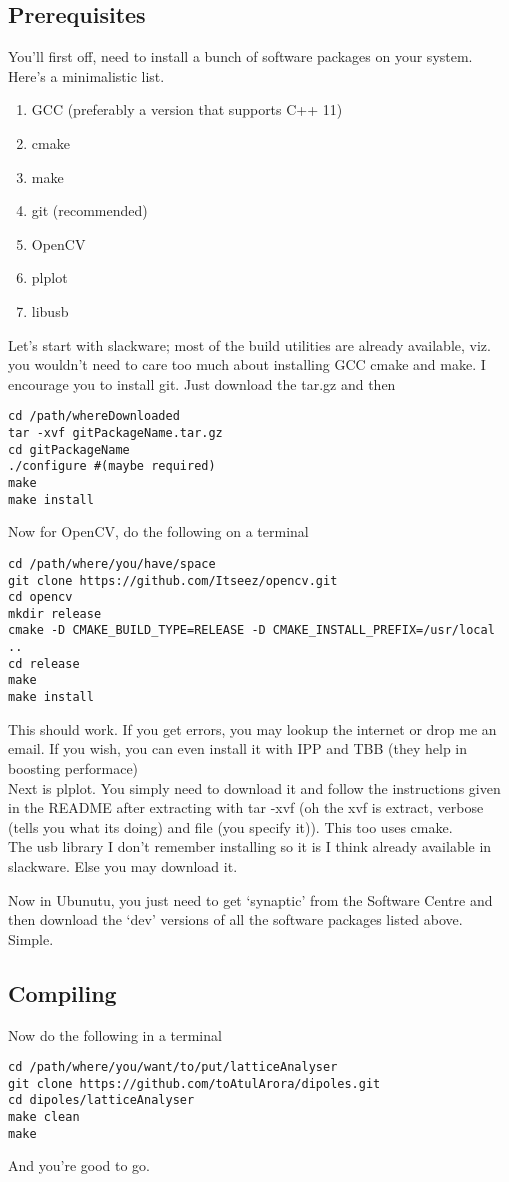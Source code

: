 	\subsection{Prerequisites}
		You'll first off, need to install a bunch of software packages on your system. Here's a minimalistic list.
		\begin{enumerate}
			\item GCC (preferably a version that supports C++ 11)
			\item cmake
			\item make
			\item git (recommended)
			\item OpenCV
			\item plplot
			\item libusb
		\end{enumerate}
		Let's start with slackware; most of the build utilities are already available, viz. you wouldn't need to care too much about installing GCC cmake and make. I encourage you to install git. Just download the tar.gz and then
		\begin{lstlisting}
cd /path/whereDownloaded
tar -xvf gitPackageName.tar.gz
cd gitPackageName
./configure #(maybe required)
make
make install
		\end{lstlisting}
		Now for OpenCV, do the following on a terminal
		\begin{lstlisting}
cd /path/where/you/have/space
git clone https://github.com/Itseez/opencv.git
cd opencv
mkdir release
cmake -D CMAKE_BUILD_TYPE=RELEASE -D CMAKE_INSTALL_PREFIX=/usr/local ..
cd release
make
make install
		\end{lstlisting}
		This should work. If you get errors, you may lookup the internet or drop me an email. If you wish, you can even install it with IPP and TBB (they help in boosting performace)\\
		Next is plplot. You simply need to download it and follow the instructions given in the README after extracting with tar -xvf (oh the xvf is extract, verbose (tells you what its doing) and file (you specify it)). This too uses cmake.\\
		The usb library I don't remember installing so it is I think already available in slackware. Else you may download it.
		\par
		Now in Ubunutu, you just need to get `synaptic' from the Software Centre and then download the `dev' versions of all the software packages listed above. Simple.		
	\subsection{Compiling}
		Now do the following in a terminal
		\begin{lstlisting}
cd /path/where/you/want/to/put/latticeAnalyser
git clone https://github.com/toAtulArora/dipoles.git
cd dipoles/latticeAnalyser
make clean
make
		\end{lstlisting}
		And you're good to go.
